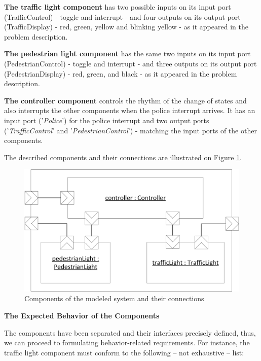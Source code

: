 \textbf{The traffic light component} has two possible inputs on its input port (TrafficControl) - toggle and interrupt - and four outputs on its output port (TrafficDisplay) - red, green, yellow and blinking yellow - as it appeared in the problem description.

\textbf{The pedestrian light component} has the same two inputs on its input port (PedestrianControl) - toggle and interrupt - and three outputs on its output port (PedestrianDisplay) - red, green, and black - as it appeared in the problem description.

\textbf{The controller component} controls the rhythm of the change of states and also interrupts the other components when the police interrupt arrives. It has an input port ('\textit{Police}') for the police interrupt and two output ports ('\textit{TrafficControl}' and '\textit{PedestrianControl}') - matching the input ports of the other components.

The described components and their connections are illustrated on Figure \ref{fig_casestudy_blockdiagram}.

\begin{figure}[!ht] 
	\centering
		\includegraphics[width=130mm, keepaspectratio]{figures/casestudy_blockdiagram.png}
	\caption{Components of the modeled system and their connections} 
	\label{fig_casestudy_blockdiagram}
\end{figure}

\textbf{The Expected Behavior of the Components} 

The components have been separated and their interfaces precisely defined, thus, we can proceed to formulating behavior-related requirements. For instance, the traffic light component must conform to the following -- not exhaustive -- list:

